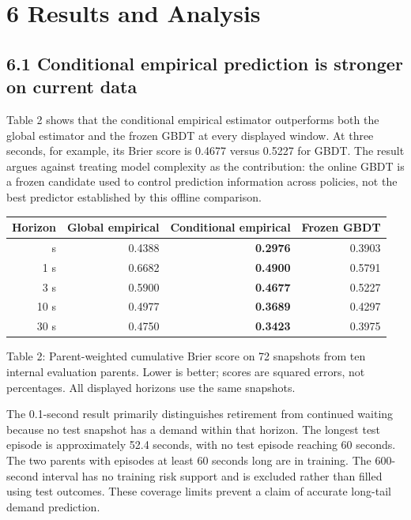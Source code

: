\documentclass[
  english,
  10pt,
]{article}
\begin{document}
\section{6 Results and Analysis}\label{results-and-analysis}

\subsection{6.1 Conditional empirical prediction is stronger on current
data}\label{conditional-empirical-prediction-is-stronger-on-current-data}

Table 2 shows that the conditional empirical estimator outperforms both
the global estimator and the frozen GBDT at every displayed window. At
three seconds, for example, its Brier score is 0.4677 versus 0.5227 for
GBDT. The result argues against treating model complexity as the
contribution: the online GBDT is a frozen candidate used to control
prediction information across policies, not the best predictor
established by this offline comparison.

\begin{longtable}[]{@{}rrrr@{}}
\toprule\noalign{}
Horizon & Global empirical & Conditional empirical & Frozen GBDT \\
\midrule\noalign{}
\endhead
\bottomrule\noalign{}
\endlastfoot
0.1 s & 0.4388 & \textbf{0.2976} & 0.3903 \\
1 s & 0.6682 & \textbf{0.4900} & 0.5791 \\
3 s & 0.5900 & \textbf{0.4677} & 0.5227 \\
10 s & 0.4977 & \textbf{0.3689} & 0.4297 \\
30 s & 0.4750 & \textbf{0.3423} & 0.3975 \\
\end{longtable}

Table 2: Parent-weighted cumulative Brier score on 72 snapshots from ten
internal evaluation parents. Lower is better; scores are squared errors,
not percentages. All displayed horizons use the same snapshots.

The 0.1-second result primarily distinguishes retirement from continued
waiting because no test snapshot has a demand within that horizon. The
longest test episode is approximately 52.4 seconds, with no test episode
reaching 60 seconds. The two parents with episodes at least 60 seconds
long are in training. The 600-second interval has no training risk
support and is excluded rather than filled using test outcomes. These
coverage limits prevent a claim of accurate long-tail demand prediction.
\end{document}
